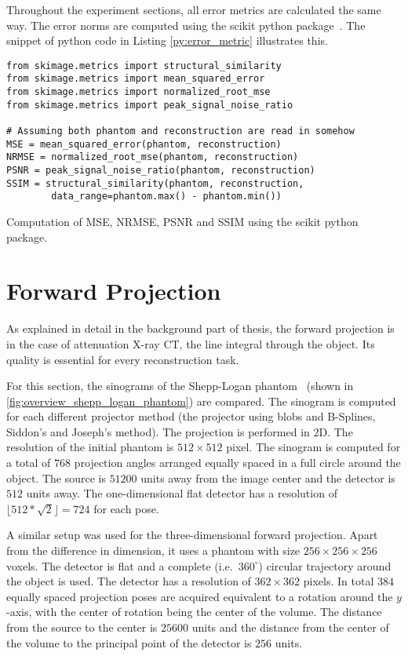 Throughout the experiment sections, all error metrics are calculated the same way. The error norms
are computed using the scikit python package~\cite{van_der_walt_scikit-image_2014}. The snippet of
python code in Listing \autoref{py:error_metric} illustrates this.

\begin{listing}[h]
	\begin{verbatim}
from skimage.metrics import structural_similarity
from skimage.metrics import mean_squared_error
from skimage.metrics import normalized_root_mse
from skimage.metrics import peak_signal_noise_ratio

# Assuming both phantom and reconstruction are read in somehow
MSE = mean_squared_error(phantom, reconstruction)
NRMSE = normalized_root_mse(phantom, reconstruction)
PSNR = peak_signal_noise_ratio(phantom, reconstruction)
SSIM = structural_similarity(phantom, reconstruction,
        data_range=phantom.max() - phantom.min())
    \end{verbatim}
	\caption{Computation of \gls{MSE}, \gls{NRMSE}, \gls{PSNR} and \gls{SSIM} using the scikit
		python package.}\label{py:error_metric}
\end{listing}

\section{Forward Projection}\label{sec:experiments_forward_projection}

As explained in detail in the background part of thesis, the forward projection is in the case of
attenuation X-ray CT, the line integral through the object. Its quality is essential for every
reconstruction task.

For this section, the sinograms of the Shepp-Logan phantom~\cite{shepp_fourier_1974} (shown in
\autoref{fig:overview_shepp_logan_phantom}) are compared. The sinogram is computed for each
different projector method (the projector using blobs and B-Splines, Siddon's and Joseph's method).
The projection is performed in \(2\)D. The resolution of the initial phantom is \(512 \times 512\)
pixel. The sinogram is computed for a total of \(768\) projection angles arranged equally spaced in
a full circle around the object. The source is \(51200\) units away from the image center and the
detector is \(512\) units away. The one-dimensional flat detector has a resolution of \(\lfloor 512
* \sqrt{2} \rfloor = 724\) for each pose.

A similar setup was used for the three-dimensional forward projection. Apart from the difference in
dimension, it uses a phantom with size \(256 \times 256 \times 256\) voxels. The detector is flat
and a complete (i.e.\ \(360^\circ\)) circular trajectory around the object is used. The detector has
a resolution of \(362 \times 362\) pixels. In total \(384\) equally spaced projection poses are
acquired equivalent to a rotation around the \(y\)-axis, with the center of rotation being the
center of the volume. The distance from the source to the center is \(25600\) units and the distance
from the center of the volume to the principal point of the detector is \(256\) units.

